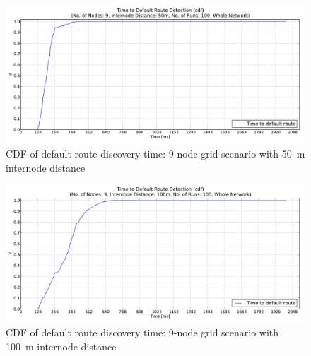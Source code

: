 \begin{figure}[htpb]
  \begin{center}
   \vspace{-20pt}
    \leavevmode
      \includegraphics[scale=0.38]
      {Pics/results/9/MRHOF/grid/dist50_montecarlo_cdf_hist.pdf}
   \caption{CDF of default route discovery time: 9-node grid scenario with 50~m internode distance}
   \label{fig:9_MRHOF_grid_50_cdf}
  \end{center}
\end{figure}

\begin{figure}[htpb]
  \begin{center}
   \vspace{-20pt}
    \leavevmode
      \includegraphics[scale=0.38]
      {Pics/results/9/MRHOF/grid/dist100_montecarlo_cdf_hist.pdf}
   \caption{CDF of default route discovery time: 9-node grid scenario with 100~m internode distance}
   \label{fig:9_MRHOF_grid_100_cdf}
  \end{center}
\end{figure}


